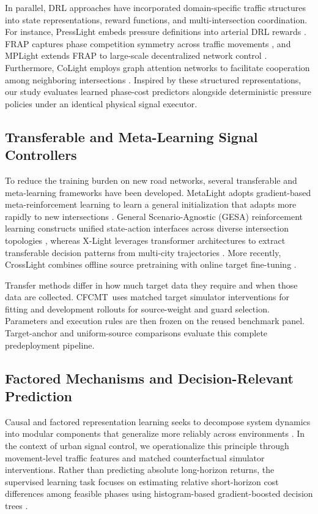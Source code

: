 \documentclass[letterpaper,journal]{IEEEtran}
\newcommand{\method}{CFCMT}
\begin{document}
In parallel, DRL approaches have incorporated domain-specific traffic structures into state representations, reward functions, and multi-intersection coordination. For instance, PressLight embeds pressure definitions into arterial DRL rewards \cite{wei2019presslight}. FRAP captures phase competition symmetry across traffic movements \cite{zheng2019frap}, and MPLight extends FRAP to large-scale decentralized network control \cite{chen2020thousandlights}. Furthermore, CoLight employs graph attention networks to facilitate cooperation among neighboring intersections \cite{wei2019colight}. Inspired by these structured representations, our study evaluates learned phase-cost predictors alongside deterministic pressure policies under an identical physical signal executor.

\subsection{Transferable and Meta-Learning Signal Controllers}
To reduce the training burden on new road networks, several transferable and meta-learning frameworks have been developed. MetaLight adopts gradient-based meta-reinforcement learning to learn a general initialization that adapts more rapidly to new intersections \cite{zang2020metalight}. General Scenario-Agnostic (GESA) reinforcement learning constructs unified state-action interfaces across diverse intersection topologies \cite{jiang2024gesa}, whereas X-Light leverages transformer architectures to extract transferable decision patterns from multi-city trajectories \cite{jiang2024xlight}. More recently, CrossLight combines offline source pretraining with online target fine-tuning \cite{sun2024crosslight}.

Transfer methods differ in how much target data they require and when those data are collected. \method\ uses matched target simulator interventions for fitting and development rollouts for source-weight and guard selection. Parameters and execution rules are then frozen on the reused benchmark panel. Target-anchor and uniform-source comparisons evaluate this complete predeployment pipeline.

\subsection{Factored Mechanisms and Decision-Relevant Prediction}
Causal and factored representation learning seeks to decompose system dynamics into modular components that generalize more reliably across environments \cite{bengio2019meta,scholkopf2021causal,feng2022factored}. In the context of urban signal control, we operationalize this principle through movement-level traffic features and matched counterfactual simulator interventions. Rather than predicting absolute long-horizon returns, the supervised learning task focuses on estimating relative short-horizon cost differences among feasible phases using histogram-based gradient-boosted decision trees \cite{friedman2001greedy,pedregosa2011scikit}.
\end{document}
